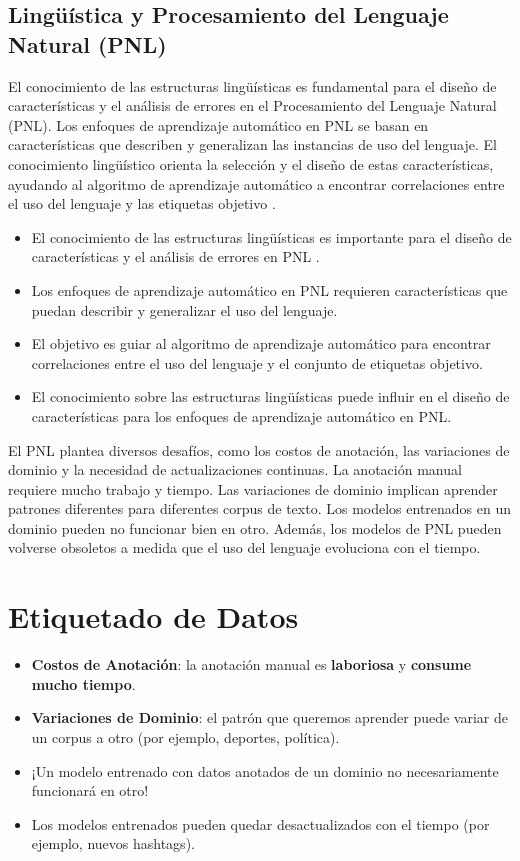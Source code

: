 \subsection{Lingüística y Procesamiento del Lenguaje Natural (PNL)}

El conocimiento de las estructuras lingüísticas es fundamental para el diseño de características y el análisis de errores en el Procesamiento del Lenguaje Natural (PNL). Los enfoques de aprendizaje automático en PNL se basan en características que describen y generalizan las instancias de uso del lenguaje. El conocimiento lingüístico orienta la selección y el diseño de estas características, ayudando al algoritmo de aprendizaje automático a encontrar correlaciones entre el uso del lenguaje y las etiquetas objetivo \cite{bender2013linguistic}.

\begin{itemize}
  \item El conocimiento de las estructuras lingüísticas es importante para el diseño de características y el análisis de errores en PNL \cite{bender2013linguistic}.
  \item Los enfoques de aprendizaje automático en PNL requieren características que puedan describir y generalizar el uso del lenguaje.
  \item El objetivo es guiar al algoritmo de aprendizaje automático para encontrar correlaciones entre el uso del lenguaje y el conjunto de etiquetas objetivo.
  \item El conocimiento sobre las estructuras lingüísticas puede influir en el diseño de características para los enfoques de aprendizaje automático en PNL.
\end{itemize}

El PNL plantea diversos desafíos, como los costos de anotación, las variaciones de dominio y la necesidad de actualizaciones continuas. La anotación manual requiere mucho trabajo y tiempo. Las variaciones de dominio implican aprender patrones diferentes para diferentes corpus de texto. Los modelos entrenados en un dominio pueden no funcionar bien en otro. Además, los modelos de PNL pueden volverse obsoletos a medida que el uso del lenguaje evoluciona con el tiempo.




\section{Etiquetado de Datos}

\begin{itemize}
   \item \textbf{Costos de Anotación}: la anotación manual es \textbf{laboriosa} y \textbf{consume mucho tiempo}.
   \item \textbf{Variaciones de Dominio}: el patrón que queremos aprender puede variar de un corpus a otro (por ejemplo, deportes, política).

   \item ¡Un modelo entrenado con datos anotados de un dominio no necesariamente funcionará en otro!
   \item Los modelos entrenados pueden quedar desactualizados con el tiempo (por ejemplo, nuevos hashtags).
\end{itemize}

